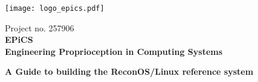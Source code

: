 \documentclass[DIV15,a4paper]{scrartcl}
\begin{document}
\begin{titlepage}

\sffamily


\texttt{[image: logo\_epics.pdf]} \hspace{0.5cm}

\begin{center}

	\vspace{1cm}
	
	Project no. 257906\\
	\textbf{EPiCS}\\
	\textbf{Engineering Proprioception in Computing Systems}
	
	\vspace{1cm}

	{\huge\textbf{A Guide to building the ReconOS/Linux reference system}}


	



\end{center}
\end{titlepage}
\end{document}
